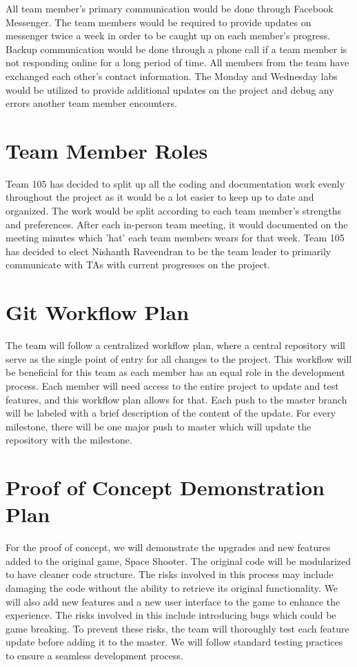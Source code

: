 \documentclass{article}
\begin{document}
All team member's primary communication would be done through Facebook Messenger. The team members would be required to provide updates on messenger twice a week in order to be caught up on each member's progress. Backup communication would be done through a phone call if a team member is not responding online for a long period of time. All members from the team have exchanged each other's contact information. The Monday and Wednesday labs would be utilized to provide additional updates on the project and debug any errors another team member encounters. 

\section{Team Member Roles}

Team 105 has decided to split up all the coding and documentation work evenly throughout the project as it would be a lot easier to keep up to date and organized. The work would be split according to each team member's strengths and preferences. After each in-person team meeting, it would documented on the meeting minutes which 'hat' each team members wears for that week. Team 105 has decided to elect Nishanth Raveendran to be the team leader to primarily communicate with TAs with current progresses on the project. 

\section{Git Workflow Plan}

The team will follow a centralized workflow plan, where a central repository will serve as the single point of entry for all changes to the project. This workflow will be beneficial for this team as each member has an equal role in the development process. Each member will need access to the entire project to update and test features, and this workflow plan allows for that. Each push to the master branch will be labeled with a brief description of the content of the update. For every milestone, there will be one major push to master which will update the repository with the milestone. 

\section{Proof of Concept Demonstration Plan}

For the proof of concept, we will demonstrate the upgrades and new features added to the original game, Space Shooter. The original code will be modularized to have cleaner code structure. The risks involved in this process may include damaging the code without the ability to retrieve its original functionality. We will also add new features and a new user interface to the game to enhance the experience. The risks involved in this include introducing bugs which could be game breaking. To prevent these risks, the team will thoroughly test each feature update before adding it to the master. We will follow standard testing practices to ensure a seamless development process.
\end{document}
